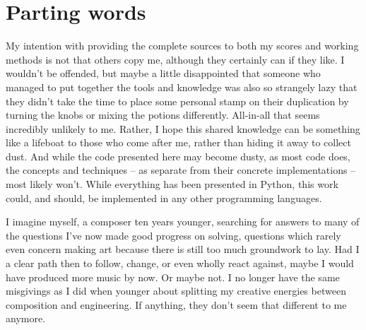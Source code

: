 \section{Parting words}
\label{sec:parting-words}

My intention with providing the complete sources to both my scores and working
methods is not that others copy me, although they certainly can if they like. I
wouldn't be offended, but maybe a little disappointed that someone who managed
to put together the tools and knowledge was also so strangely lazy that they
didn't take the time to place some personal stamp on their duplication by
turning the knobs or mixing the potions differently. All-in-all that seems
incredibly unlikely to me. Rather, I hope this shared knowledge can be
something like a lifeboat to those who come after me, rather than hiding it
away to collect dust. And while the code presented here may become dusty, as
most code does, the concepts and techniques -- as separate from their concrete
implementations -- most likely won't. While everything has been presented in
Python, this work could, and should, be implemented in any other programming
languages.

I imagine myself, a composer ten years younger, searching for answers to many
of the questions I've now made good progress on solving, questions which rarely
even concern making art because there is still too much groundwork to lay. Had
I a clear path then to follow, change, or even wholly react against, maybe I
would have produced more music by now. Or maybe not. I no longer have the same
misgivings as I did when younger about splitting my creative energies between
composition and engineering. If anything, they don't seem that different to me
anymore.
